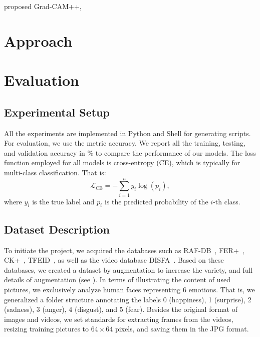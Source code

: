\citet{chattopadhay2018grad} proposed Grad-CAM++,

\section{Approach}
\label{sec:approach}

\section{Evaluation}
\label{sec:evaluation}

\subsection{Experimental Setup}
\label{sec:evaluation:setup}

All the experiments are implemented in Python and Shell for generating scripts. 
For evaluation, we use the metric accuracy. 
We report all the training, testing, and validation accuracy in \% to compare the performance of our models. 
The loss function employed for all models is cross-entropy (CE), which is typically for multi-class classification. 
That is:
\begin{equation}
  \mathcal{L}_{\text{CE}} = -\sum_{i=1}^{n} y_i \log(p_i),
\end{equation}
where $y_i$ is the true label and $p_i$ is the predicted probability of the $i$-th class.

\subsection{Dataset Description}
\label{sec:evaluation:datasets}



To initiate the project, %
we acquired the databases such as RAF-DB~\cite{li_reliable_2017,li2019reliable}, 
FER+~\cite{BarsoumZCZ16}, CK+~\cite{LuceyCKSAM10}, TFEID~\cite{tfeid,LiGL22}, 
as well as the video database DISFA~\cite{MavadatiMBTC13}. 
Based on these databases, we created a dataset by augmentation to increase the variety, 
and full details of augmentation (see ). 
In terms of illustrating the content of used pictures, we exclusively analyze human faces representing 6 emotions. 
That is, 
we generalized a folder structure annotating the labels 0 (happiness), 1 (surprise), 2 (sadness), 3 (anger), 4 (disgust), and 5 (fear). 
Besides the original format of images and videos, we set standards for extracting frames from the videos, 
resizing training pictures to $64\times 64$ pixels, and saving them in the JPG format.

